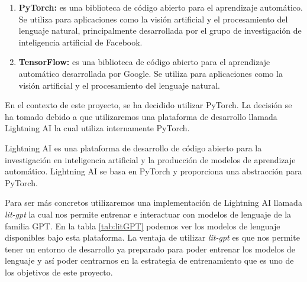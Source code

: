 \begin{enumerate}
    \item \textbf{PyTorch:} es una biblioteca de código abierto para el aprendizaje
        automático. Se utiliza para aplicaciones como la visión artificial y el
        procesamiento del lenguaje natural, principalmente desarrollada por el
        grupo de investigación de inteligencia artificial de Facebook. \cite{PyTorch}
    \item \textbf{TensorFlow:} es una biblioteca de código abierto para el aprendizaje
        automático desarrollada por Google. Se utiliza para aplicaciones como la visión
        artificial y el procesamiento del lenguaje natural. \cite{TensorFlow}
\end{enumerate}

En el contexto de este proyecto, se ha decidido utilizar PyTorch. La decisión se ha
tomado debido a que utilizaremos una plataforma de desarrollo llamada Lightning AI
la cual utiliza internamente PyTorch.

Lightning AI es una plataforma de desarrollo de código abierto para la investigación
en inteligencia artificial y la producción de modelos de aprendizaje automático.
Lightning AI se basa en PyTorch y proporciona una abstracción para PyTorch. \cite{LightningAI}

Para ser más concretos utilizaremos una implementación de Lightning AI llamada
\textit{lit-gpt}\cite{litGPT} la cual nos permite entrenar e interactuar con modelos de lenguaje
de la familia GPT. En la tabla \ref{tab:litGPT} podemos ver los modelos de lenguaje
disponibles bajo esta plataforma. La ventaja de utilizar \textit{lit-gpt} es que nos permite
tener un entorno de desarrollo ya preparado para poder entrenar los modelos de lenguaje
y así poder centrarnos en la estrategia de entrenamiento que es uno de los objetivos de
este proyecto.

